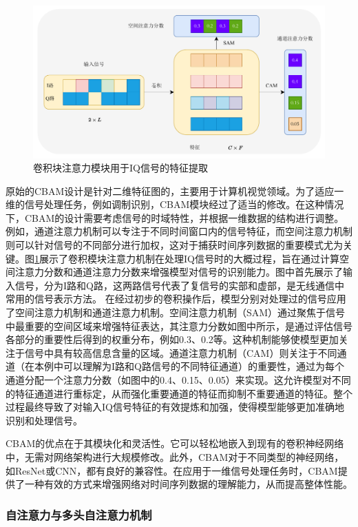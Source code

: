 \begin{figure}
    \centering
    \includegraphics[width=\textwidth]{Image/cbam_on_iq.pdf}
    \caption{卷积块注意力模块用于IQ信号的特征提取}
    \label{fig:cbam_iq}
\end{figure}

原始的CBAM设计是针对二维特征图的，主要用于计算机视觉领域。为了适应一维的信号处理任务，例如调制识别，CBAM模块经过了适当的修改。在这种情况下，CBAM的设计需要考虑信号的时域特性，并根据一维数据的结构进行调整。例如，通道注意力机制可以专注于不同时间窗口内的信号特征，而空间注意力机制则可以针对信号的不同部分进行加权，这对于捕获时间序列数据的重要模式尤为关键。图\ref{fig:cbam_iq}展示了卷积模块注意力机制在处理IQ信号时的大概过程，旨在通过计算空间注意力分数和通道注意力分数来增强模型对信号的识别能力。图中首先展示了输入信号，分为I路和Q路，这两路信号代表了复信号的实部和虚部，是无线通信中常用的信号表示方法。
在经过初步的卷积操作后，模型分别对处理过的信号应用了空间注意力机制和通道注意力机制。空间注意力机制（SAM）通过聚焦于信号中最重要的空间区域来增强特征表达，其注意力分数如图中所示，是通过评估信号各部分的重要性后得到的权重分布，例如0.3、0.2等。这种机制能够使模型更加关注于信号中具有较高信息含量的区域。通道注意力机制（CAM）则关注于不同通道（在本例中可以理解为I路和Q路信号的不同特征通道）的重要性，通过为每个通道分配一个注意力分数（如图中的0.4、0.15、0.05）来实现。这允许模型对不同的特征通道进行重标定，从而强化重要通道的特征而抑制不重要通道的特征。整个过程最终导致了对输入IQ信号特征的有效提炼和加强，使得模型能够更加准确地识别和处理信号。

CBAM的优点在于其模块化和灵活性。它可以轻松地嵌入到现有的卷积神经网络中，无需对网络架构进行大规模修改。此外，CBAM对于不同类型的神经网络，如ResNet或CNN，都有良好的兼容性。在应用于一维信号处理任务时，CBAM提供了一种有效的方式来增强网络对时间序列数据的理解能力，从而提高整体性能。

\subsubsection{自注意力与多头自注意力机制}\label{sec:background}


